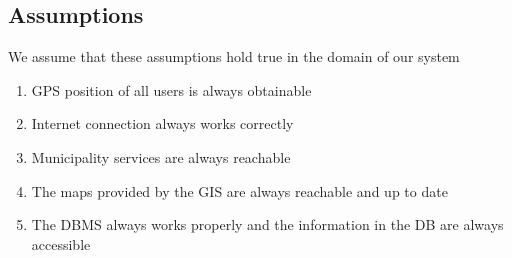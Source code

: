 \subsection{Assumptions}
	We assume that these assumptions hold true in the domain of our system 
	\begin{enumerate}[label=\textbf{	DA\arabic*}]
		\item GPS position of all users is always obtainable
		\item Internet connection always works correctly
		\item Municipality services are always reachable
		\item The maps provided by the GIS are always reachable and up to date
		\item The DBMS always works properly and the information in the DB are always accessible
	\end{enumerate}
		
\clearpage